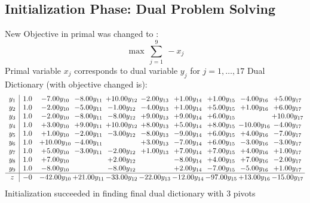\documentclass[9pt]{article}
\begin{document}
\subsection{Initialization Phase: Dual Problem Solving}
New Objective in primal was changed to : \[ \max\ \sum_{j=1}^{9}\ - x_j \] 
Primal variable $x_j$ corresponds to dual variable $y_j$ for $j = 1,\ldots,17$
Dual Dictionary (with objective changed is): 
\[\begin{array}{c| c c@{\hskip 2pt} c@{\hskip 2pt} c@{\hskip 2pt} c@{\hskip 2pt} c@{\hskip 2pt} c@{\hskip 2pt} c@{\hskip 2pt} c@{\hskip 2pt} }
 y_{1}   &  1.0 & -7.00 y_{10} & -8.00 y_{11} & + 10.00 y_{12} & -2.00 y_{13} & +  1.00 y_{14} & +  1.00 y_{15} & -4.00 y_{16} & +  5.00 y_{17}\\
 y_{2}   &  1.0 & -2.00 y_{10} & -5.00 y_{11} & -1.00 y_{12} & -4.00 y_{13} & +  1.00 y_{14} & +  5.00 y_{15} & +  1.00 y_{16} & +  6.00 y_{17}\\
 y_{3}   &  1.0 & -2.00 y_{10} & -8.00 y_{11} & -8.00 y_{12} & +  9.00 y_{13} & +  9.00 y_{14} & +  6.00 y_{15} &   & + 10.00 y_{17}\\
 y_{4}   &  1.0 & +  3.00 y_{10} & +  9.00 y_{11} & + 10.00 y_{12} & +  8.00 y_{13} & +  5.00 y_{14} & +  8.00 y_{15} & -10.00 y_{16} & -4.00 y_{17}\\
 y_{5}   &  1.0 & +  1.00 y_{10} & -2.00 y_{11} & -3.00 y_{12} & -8.00 y_{13} & -9.00 y_{14} & +  6.00 y_{15} & +  4.00 y_{16} & -7.00 y_{17}\\
 y_{6}   &  1.0 & + 10.00 y_{10} & -4.00 y_{11} &   & +  3.00 y_{13} & -7.00 y_{14} & +  6.00 y_{15} & -3.00 y_{16} & -3.00 y_{17}\\
 y_{7}   &  1.0 & +  5.00 y_{10} & -3.00 y_{11} & -2.00 y_{12} & +  1.00 y_{13} & +  7.00 y_{14} & +  7.00 y_{15} & +  4.00 y_{16} & +  1.00 y_{17}\\
 y_{8}   &  1.0 & +  7.00 y_{10} &   & +  2.00 y_{12} &   & -8.00 y_{14} & +  4.00 y_{15} & +  7.00 y_{16} & -2.00 y_{17}\\
 y_{9}   &  1.0 & -8.00 y_{10} &   & -8.00 y_{12} &   & +  2.00 y_{14} & -7.00 y_{15} & -5.00 y_{16} & +  1.00 y_{17}\\
\hline
z    &  -0 & -42.00 y_{10} & + 21.00 y_{11} & -33.00 y_{12} & -22.00 y_{13} & -12.00 y_{14} & -97.00 y_{15} & + 13.00 y_{16} & -15.00 y_{17}\\
\end{array}\]
Initialization succeeded in finding final dual dictionary with 3 pivots
\end{document}
